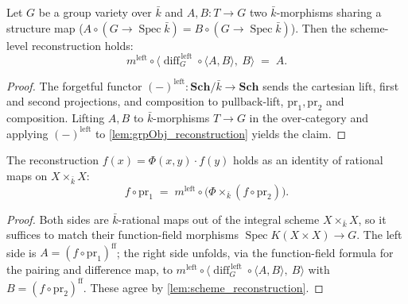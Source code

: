 \begin{lemma}\leanok
  \label{lem:scheme_reconstruction}
  Let \(G\) be a group variety over \(\bar k\) and \(A, B \colon T \to G\) two
  \(\bar k\)-morphisms sharing a structure map (\(A \circ (G \to \operatorname{Spec}\bar k)
  = B \circ (G \to \operatorname{Spec}\bar k)\)). Then the scheme-level reconstruction holds:
  \[
    m^{\mathrm{left}} \circ \bigl\langle
      \operatorname{diff}_G^{\,\mathrm{left}} \circ \langle A, B\rangle,\ B
    \bigr\rangle \;=\; A .
  \]
\end{lemma}
\begin{proof}\leanok
  The forgetful functor \((-)^{\mathrm{left}} \colon \mathbf{Sch}/\bar k \to \mathbf{Sch}\)
  sends the cartesian lift, first and second projections, and composition to
  \(\mathrm{pullback}\)-lift, \(\mathrm{pr}_1, \mathrm{pr}_2\) and composition. Lifting \(A,
  B\) to \(\bar k\)-morphisms \(T \to G\) in the over-category and applying
  \((-)^{\mathrm{left}}\) to \cref{lem:grpObj_reconstruction} yields the claim.
\end{proof}

\begin{lemma}\leanok
  \label{lem:rationalMap_difference_reconstruct}
  The reconstruction \(f(x) = \Phi(x,y) \cdot f(y)\) holds as an identity of rational maps
  on \(X \times_{\bar k} X\):
  \[
    f \circ \mathrm{pr}_1 \;=\; m^{\mathrm{left}} \circ
    \bigl(\Phi \times_{\bar k} (f \circ \mathrm{pr}_2)\bigr).
  \]
\end{lemma}
\begin{proof}\leanok
  Both sides are \(\bar k\)-rational maps out of the integral scheme \(X \times_{\bar k}
  X\), so it suffices to match their function-field morphisms \(\operatorname{Spec}
  K(X \times X) \to G\). The left side is \(A = (f \circ \mathrm{pr}_1)^{\mathrm{ff}}\); the
  right side unfolds, via the function-field formula for the pairing and difference map, to
  \(m^{\mathrm{left}} \circ \langle \operatorname{diff}_G^{\,\mathrm{left}} \circ \langle A,
  B\rangle,\ B\rangle\) with \(B = (f \circ \mathrm{pr}_2)^{\mathrm{ff}}\). These agree by
  \cref{lem:scheme_reconstruction}.
\end{proof}

